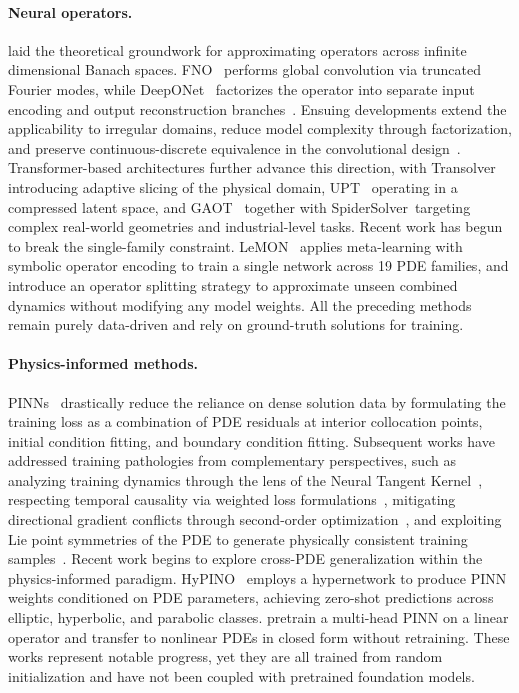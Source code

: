 \documentclass{article}
\begin{document}
\paragraph{Neural operators.}
\citet{kovachki2023neural} laid the theoretical groundwork for approximating operators across infinite dimensional Banach spaces. FNO~\cite{li2021fourier} performs global convolution via truncated Fourier modes, while DeepONet~\cite{lu2021deeponet} factorizes the operator into separate input encoding and output reconstruction branches~\cite{chen1995universal}. Ensuing developments extend the applicability to irregular domains, reduce model complexity through factorization, and preserve continuous-discrete equivalence in the convolutional design~\cite{li2023geo,tran2023ffno,raonic2024cno}. Transformer-based architectures further advance this direction, with Transolver~\cite{wu2024transolver} introducing adaptive slicing of the physical domain, UPT~\cite{alkin2024upt} operating in a compressed latent space, and GAOT~\cite{wen2025gaot} together with SpiderSolver~\cite{qi2025spidersolver}targeting complex real-world geometries and industrial-level tasks. Recent work has begun to break the single-family constraint. LeMON~\cite{sun2024lemon} applies meta-learning with symbolic operator encoding to train a single network across 19 PDE families, and \citet{serrano2026splitting} introduce an operator splitting strategy to approximate unseen combined dynamics without modifying any model weights. All the preceding methods remain purely data-driven and rely on ground-truth solutions for training.

\paragraph{Physics-informed methods.}
PINNs~\cite{raissi2019pinn} drastically reduce the reliance on dense solution data by formulating the training loss as a combination of PDE residuals at interior collocation points, initial condition fitting, and boundary condition fitting. Subsequent works have addressed training pathologies from complementary perspectives, such as analyzing training dynamics through the lens of the Neural Tangent Kernel~\cite{wang2020ntkpinn}, respecting temporal causality via weighted loss formulations~\cite{wang2022causalpinn}, mitigating directional gradient conflicts through second-order optimization~\cite{wang2025gradientalignment}, and exploiting Lie point symmetries of the PDE to generate physically consistent training samples~\cite{brandstetter2022lpsda}. Recent work begins to explore cross-PDE generalization within the physics-informed paradigm. HyPINO~\cite{bischof2025hypino_neurips} employs a hypernetwork to produce PINN weights conditioned on PDE parameters, achieving zero-shot predictions across elliptic, hyperbolic, and parabolic classes. \citet{auroy2025perturbativepinn} pretrain a multi-head PINN on a linear operator and transfer to nonlinear PDEs in closed form without retraining. These works represent notable progress, yet they are all trained from random initialization and have not been coupled with pretrained foundation models.
\end{document}
